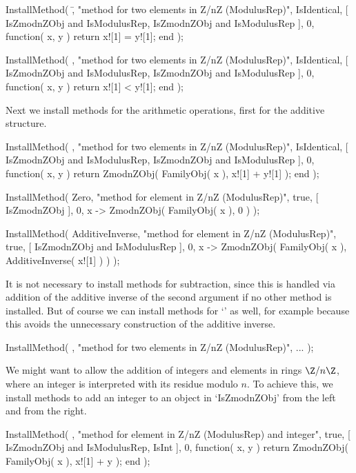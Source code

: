 \beginexample
    InstallMethod( \=,
        "method for two elements in Z/nZ (ModulusRep)",
        IsIdentical,
        [ IsZmodnZObj and IsModulusRep, IsZmodnZObj and IsModulusRep ],
        0,
        function( x, y ) return x![1] = y![1]; end );

    InstallMethod( \<,
        "method for two elements in Z/nZ (ModulusRep)",
        IsIdentical,
        [ IsZmodnZObj and IsModulusRep, IsZmodnZObj and IsModulusRep ],
        0,
        function( x, y ) return x![1] < y![1]; end );
\endexample

Next we install methods for the arithmetic operations,
first for the additive structure.

\beginexample
    InstallMethod( \+,
        "method for two elements in Z/nZ (ModulusRep)",
        IsIdentical,
        [ IsZmodnZObj and IsModulusRep, IsZmodnZObj and IsModulusRep ], 0,
        function( x, y )
        return ZmodnZObj( FamilyObj( x ), x![1] + y![1] );
        end );

    InstallMethod( Zero,
        "method for element in Z/nZ (ModulusRep)",
        true,
        [ IsZmodnZObj ], 0,
        x -> ZmodnZObj( FamilyObj( x ), 0 ) );

    InstallMethod( AdditiveInverse,
        "method for element in Z/nZ (ModulusRep)",
        true,
        [ IsZmodnZObj and IsModulusRep ], 0,
        x -> ZmodnZObj( FamilyObj( x ), AdditiveInverse( x![1] ) ) );
\endexample

It is not necessary to install methods for subtraction,
since this is handled via addition of the additive inverse of
the second argument if no other method is installed.
But of course we can install methods for `\-'  as well,
for example because this avoids the unnecessary construction of the
additive inverse.

\beginexample
    InstallMethod( \-,
        "method for two elements in Z/nZ (ModulusRep)",
        ... );
\endexample

We might want to allow the addition of integers and elements in
rings $\Z/n\Z$, where an integer is interpreted with its residue modulo
$n$.
To achieve this, we install methods to add an integer to an object in
`IsZmodnZObj' from the left and from the right.

\beginexample
    InstallMethod( \+,
        "method for element in Z/nZ (ModulusRep) and integer",
        true,
        [ IsZmodnZObj and IsModulusRep, IsInt ], 0,
        function( x, y )
        return ZmodnZObj( FamilyObj( x ), x![1] + y );
        end );

